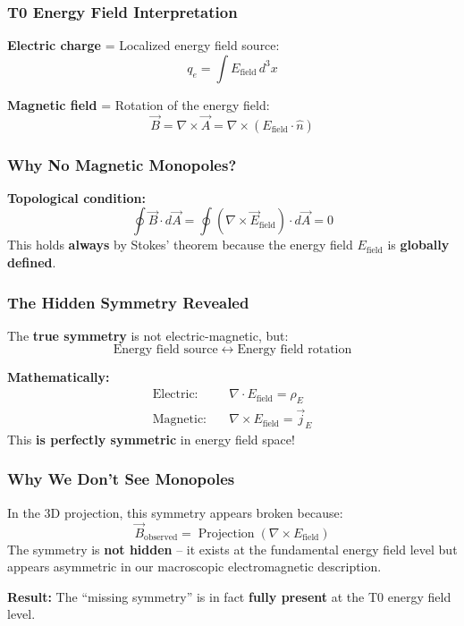 	\subsubsection*{T0 Energy Field Interpretation}
	
	\textbf{Electric charge} = Localized energy field source:
	\[
	q_e = \int E_{\text{field}} \, d^3x
	\]
	
	\textbf{Magnetic field} = Rotation of the energy field:
	\[
	\vec{B} = \nabla \times \vec{A} = \nabla \times (E_{\text{field}} \cdot \hat{n})
	\]
	
	\subsubsection*{Why No Magnetic Monopoles?}
	
	\textbf{Topological condition:}
	\[
	\oint \vec{B} \cdot d\vec{A} = \oint (\nabla \times \vec{E}_{\text{field}}) \cdot d\vec{A} = 0
	\]
	This holds \textbf{always} by Stokes' theorem because the energy field $E_{\text{field}}$ is \textbf{globally defined}.
	
	\subsubsection*{The Hidden Symmetry Revealed}
	
	The \textbf{true symmetry} is not electric-magnetic, but:
	\[
	\boxed{\text{Energy field source} \;\leftrightarrow\; \text{Energy field rotation}}
	\]
	
	\textbf{Mathematically:}
	\begin{align*}
		\text{Electric:} \quad &\nabla \cdot E_{\text{field}} = \rho_E \\
		\text{Magnetic:} \quad &\nabla \times E_{\text{field}} = \vec{j}_E
	\end{align*}
	This \textbf{is perfectly symmetric} in energy field space!
	
	\subsubsection*{Why We Don't See Monopoles}
	
	In the 3D projection, this symmetry appears broken because:
	\[
	\vec{B}_{\text{observed}} = \operatorname{Projection}(\nabla \times E_{\text{field}})
	\]
	The symmetry is \textbf{not hidden} – it exists at the fundamental energy field level but appears asymmetric in our macroscopic electromagnetic description.
	
	\textbf{Result:} The ``missing symmetry'' is in fact \textbf{fully present} at the T0 energy field level.
	

